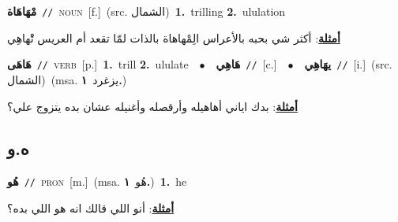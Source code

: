 \documentclass[10pt,a4paper,twoside]{article} %
\begin{document}
\begin{multicols}{2}
{\setlength\topsep{0pt}\textbf{\foreignlanguage{arabic}{مْهَاهَاة}}\ {\color{gray}\texttt{//}\color{black}}\ \textsc{noun}\ [f.]\ (src. \color{gray}\foreignlanguage{arabic}{الشمال}\color{black})\ \textbf{1.}~trilling  \textbf{2.}~ululation\  \begin{flushright}\color{gray}\foreignlanguage{arabic}{\textbf{\underline{\foreignlanguage{arabic}{أمثلة}}}: أكثر شي بحبه بالأعراس الِمْهاهاة بالذات لمّا تقعد أم العريس تْْهاهِي}\end{flushright}\color{black}} \vspace{2mm}

{\setlength\topsep{0pt}\textbf{\foreignlanguage{arabic}{هَاهَى}}\ {\color{gray}\texttt{//}\color{black}}\ \textsc{verb}\ [p.]\ \textbf{1.}~trill  \textbf{2.}~ululate\ \ $\bullet$\ \ \setlength\topsep{0pt}\textbf{\foreignlanguage{arabic}{هَاهِي}}\ {\color{gray}\texttt{//}\color{black}}\ [c.]\ \ $\bullet$\ \ \setlength\topsep{0pt}\textbf{\foreignlanguage{arabic}{يهَاهِي}}\ {\color{gray}\texttt{//}\color{black}}\ [i.]\ (src. \color{gray}\foreignlanguage{arabic}{الشمال}\color{black})\ \color{gray}(msa. \foreignlanguage{arabic}{يزغرد}~\foreignlanguage{arabic}{\textbf{١.}})\color{black}\  \begin{flushright}\color{gray}\foreignlanguage{arabic}{\textbf{\underline{\foreignlanguage{arabic}{أمثلة}}}: بدك اياني أهاهيله وأرقصله وأغنيله عشان بده يتزوج علي؟}\end{flushright}\color{black}} \vspace{2mm}

\vspace{-3mm}
\subsection*{\color{blue}\foreignlanguage{arabic}{ه.و}\color{blue}{ (ntws)}} 

{\setlength\topsep{0pt}\textbf{\foreignlanguage{arabic}{هُو}}\ {\color{gray}\texttt{//}\color{black}}\ \textsc{pron}\ [m.]\ \color{gray}(msa. \foreignlanguage{arabic}{هُو}~\foreignlanguage{arabic}{\textbf{١.}})\color{black}\ \textbf{1.}~he\  \begin{flushright}\color{gray}\foreignlanguage{arabic}{\textbf{\underline{\foreignlanguage{arabic}{أمثلة}}}: أنو اللي قالك انه هو اللي بده؟}\end{flushright}\color{black}} \vspace{2mm}


\end{multicols}
\end{document}
